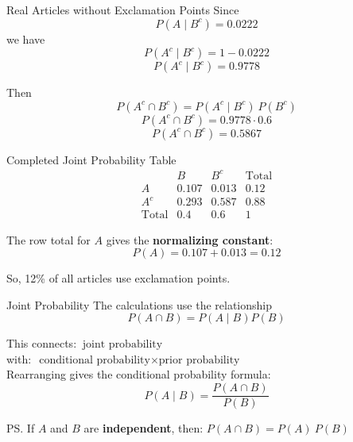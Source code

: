 \documentclass[12pt]{beamer}
\begin{document}
\begin{frame}{}
\begin{block}{Real Articles without Exclamation Points}
Since
\[
P(A\mid B^c)=0.0222
\]
we have
\[
P(A^c\mid B^c)=1-0.0222
\]
\[
P(A^c\mid B^c)=0.9778
\]

Then
\[
P(A^c \cap B^c)=P(A^c\mid B^c) ~ P(B^c)
\]
\[
P(A^c \cap B^c)=0.9778 \cdot 0.6
\]
\[
P(A^c \cap B^c)=0.5867
\]
\end{block}
\end{frame}

\begin{frame}{}
\begin{block}{Completed Joint Probability Table}
\[
\begin{array}{c|ccc}
 & B & B^c & \text{Total} \\
\hline
A   & 0.107 & 0.013 & 0.12 \\
A^c & 0.293 & 0.587 & 0.88 \\
\hline
\text{Total} & 0.4 & 0.6 & 1
\end{array}
\]

The row total for \(A\) gives the \textbf{normalizing constant}:
\[
P(A) = 0.107 + 0.013 = \boxed{0.12}
\]

So, 12\% of all articles use exclamation points.
\end{block}
\end{frame}

\begin{frame}{}
\begin{block}{Joint Probability}
The calculations use the relationship
\[
P(A \cap B)=P(A\mid B)P(B)
\]

This connects: $~ \text{joint probability}$\\

with: $~ \text{conditional probability} \times \text{prior probability}$\\

Rearranging gives the conditional probability formula:
\[
P(A\mid B)=\frac{P(A \cap B)}{P(B)}
\]

\textcolor{aggiemaroon!70}{
PS. If \(A\) and \(B\) are \textbf{independent}, then:
$P(A \cap B) = P(A) ~ P(B)$
}
\end{block}
\end{frame}
\end{document}
